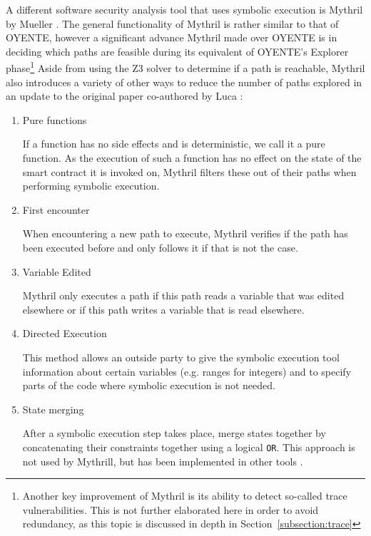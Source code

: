 \documentclass[letterpaper,twocolumn,10pt]{article}
\begin{document}
 A different software security analysis tool that uses symbolic execution is Mythril by Mueller \cite{mueller}. The general functionality of Mythril is rather similar to that of OYENTE, however a significant advance Mythril made over OYENTE is in deciding which paths are feasible during its equivalent of OYENTE's Explorer phase\footnote{Another key improvement of Mythril is its ability to detect so-called trace vulnerabilities. This is not further elaborated here in order to avoid redundancy, as this topic is discussed in depth in Section~\ref{subsection:trace}} Aside from using the Z3 solver to determine if a path is reachable, Mythril also introduces a variety of other ways to reduce the number of paths explored in an update to the original paper co-authored by Luca \cite{mueller_luca_2019}: 

\begin{enumerate}
	\item Pure functions 
	
	If a function has no side effects and is deterministic, we call it a pure function. As the execution of such a function has no effect on the state of the smart contract it is invoked on, Mythril filters these out of their paths when performing symbolic execution.
	
	\item First encounter
	
	
	When encountering a new path to execute, Mythril verifies if the path has been executed before and only follows it if that is not the case.
	
	\item Variable Edited

	Mythril only executes a path if this path reads a variable that was edited elsewhere or if this path writes a variable that is read elsewhere.
	
	\item Directed Execution
	
	This method allows an outside party to give the symbolic execution tool information about certain variables (e.g. ranges for integers) and to specify parts of the code where symbolic execution is not needed.	
	
	\item State merging
	
	After a symbolic execution step takes place, merge states together by concatenating their constraints together using a logical \verb|OR|. This approach is not used by Mythrill, but has been implemented in other tools \cite{mossberg_manzano_hennenfent_groce_grieco_feist_brunson_dinaburg_2019}.
	
	
\end{enumerate}
\end{document}
